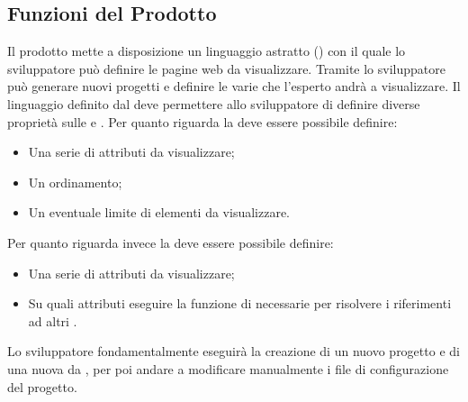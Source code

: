 	\subsection{Funzioni del Prodotto}
	Il prodotto \ProjectName{} mette a disposizione un linguaggio astratto () con il quale lo sviluppatore può definire le pagine web da visualizzare. Tramite \ProjectName{} lo sviluppatore può generare nuovi progetti e definire le varie \textit{} che l'esperto  andrà a visualizzare. Il linguaggio definito dal  deve permettere allo sviluppatore di definire diverse proprietà sulle \textit{} e \textit{}. Per quanto riguarda la \textit{} deve essere possibile definire:
	\begin{itemize}
		\item Una serie di attributi da visualizzare;
		\item Un ordinamento;
		\item Un eventuale limite di elementi da visualizzare.
	\end{itemize}
	Per quanto riguarda invece la \textit{} deve essere possibile definire:
	\begin{itemize}	
		\item Una serie di attributi da visualizzare;
		\item Su quali attributi eseguire la funzione \textit{} di  necessarie per risolvere i riferimenti ad altri . 	
	\end{itemize}
	
Lo sviluppatore fondamentalmente eseguirà la creazione di un nuovo progetto e di una nuova \textit{} da , per poi andare a modificare manualmente i file di configurazione del progetto.
		
